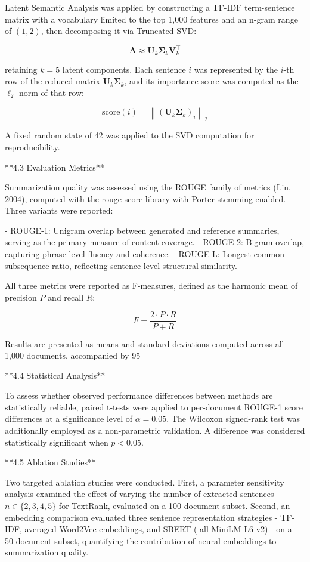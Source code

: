 \documentclass[10pt]{book}
\begin{document}
Latent Semantic Analysis was applied by constructing a TF-IDF term-sentence matrix with a vocabulary limited to the top 1,000 features and an n-gram range of $(1, 2)$, then decomposing it via Truncated SVD:

$$\mathbf{A} \approx \mathbf{U}_k \boldsymbol{\Sigma}_k \mathbf{V}_k^\top$$

retaining $k = 5$ latent components. Each sentence $i$ was represented by the $i$-th row of the reduced matrix $\mathbf{U}_k \boldsymbol{\Sigma}_k$, and its importance score was computed as the $\ell_2$ norm of that row:

$$\text{score}(i) = \left\| (\mathbf{U}_k \boldsymbol{\Sigma}_k)_i \right\|_2$$

A fixed random state of 42 was applied to the SVD computation for reproducibility.

**4.3 Evaluation Metrics**

Summarization quality was assessed using the ROUGE family of metrics (Lin, 2004), computed with the rouge-score library with Porter stemming enabled. Three variants were reported:

- ROUGE-1: Unigram overlap between generated and reference summaries, serving as the primary measure of content coverage.
- ROUGE-2: Bigram overlap, capturing phrase-level fluency and coherence.
- ROUGE-L: Longest common subsequence ratio, reflecting sentence-level structural similarity.

All three metrics were reported as F-measures, defined as the harmonic mean of precision $P$ and recall $R$:

$$F = \frac{2 \cdot P \cdot R}{P + R}$$

Results are presented as means and standard deviations computed across all 1,000 documents, accompanied by 95%

**4.4 Statistical Analysis**

To assess whether observed performance differences between methods are statistically reliable, paired t-tests were applied to per-document ROUGE-1 score differences at a significance level of $\alpha = 0.05$. The Wilcoxon signed-rank test was additionally employed as a non-parametric validation. A difference was considered statistically significant when $p < 0.05$.

**4.5 Ablation Studies**

Two targeted ablation studies were conducted. First, a parameter sensitivity analysis examined the effect of varying the number of extracted sentences $n \in \{2, 3, 4, 5\}$  for TextRank, evaluated on a 100-document subset. Second, an embedding comparison evaluated three sentence representation strategies - TF-IDF, averaged Word2Vec embeddings, and SBERT (
all-MiniLM-L6-v2) - on a 50-document subset, quantifying the contribution of neural embeddings to summarization quality.
\end{document}
